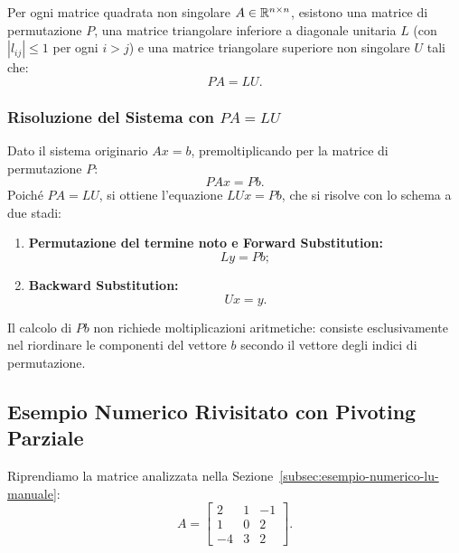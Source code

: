 \begin{theorem}[Fattorizzazione $PA = LU$]
\label{thm:pa-lu}
Per ogni matrice quadrata non singolare $A \in \mathbb{R}^{n \times n}$, esistono una matrice di permutazione $P$, una matrice triangolare inferiore a diagonale unitaria $L$ (con $|l_{ij}| \le 1$ per ogni $i > j$) e una matrice triangolare superiore non singolare $U$ tali che:
\begin{equation}
    P A = L U.
    \label{eq:teorema-pa-lu}
\end{equation}
\end{theorem}

\subsubsection{Risoluzione del Sistema con $PA = LU$}
Dato il sistema originario $Ax = b$, premoltiplicando per la matrice di permutazione $P$:
\begin{equation}
    P A x = P b.
\end{equation}
Poich\'e $PA = LU$, si ottiene l'equazione $LUx = Pb$, che si risolve con lo schema a due stadi:
\begin{enumerate}
    \item \textbf{Permutazione del termine noto e Forward Substitution:}
    \begin{equation}
        L y = P b;
    \end{equation}
    \item \textbf{Backward Substitution:}
    \begin{equation}
        U x = y.
    \end{equation}
\end{enumerate}
Il calcolo di $Pb$ non richiede moltiplicazioni aritmetiche: consiste esclusivamente nel riordinare le componenti del vettore $b$ secondo il vettore degli indici di permutazione.

\subsection{Esempio Numerico Rivisitato con Pivoting Parziale}
Riprendiamo la matrice analizzata nella Sezione~\ref{subsec:esempio-numerico-lu-manuale}:
\begin{equation}
    A = \begin{bmatrix}
        2 & 1 & -1 \\
        1 & 0 & 2 \\
        -4 & 3 & 2
    \end{bmatrix}.
\end{equation}

